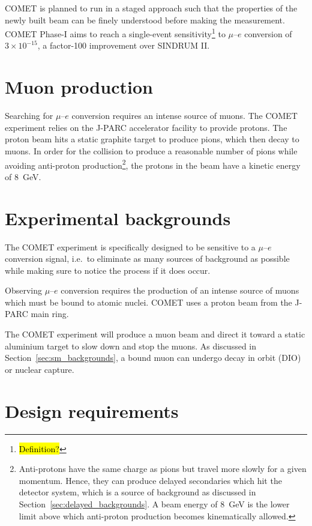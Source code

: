 COMET is planned to run in a staged approach such that the properties of the
newly built beam can be finely understood before making the measurement. COMET
Phase-I aims to reach a single-event sensitivity\footnote{\hl{Definition?}} to $\mu$--$e$ conversion of
$3\times 10^{-15}$, a factor-100 improvement over SINDRUM II.

\section{Muon production}
Searching for $\mu$--$e$ conversion requires an intense source of muons. The
COMET experiment relies on the J-PARC accelerator facility to provide protons.
The proton beam hits a static graphite target to produce pions, which then decay
to muons. In order for the collision to produce a reasonable number of pions
while avoiding anti-proton production\footnote{
Anti-protons have the same charge as pions but travel more slowly for a given
momentum. Hence, they can produce delayed secondaries which hit the detector
system, which is a source of background as discussed in
Section~\ref{sec:delayed_backgrounds}. A beam energy of \SI{8}{\GeV} is the
lower limit above which anti-proton production becomes kinematically allowed.
}, the protons in the beam have a kinetic energy of \SI{8}{\GeV}. 


\section{Experimental backgrounds}\label{sec:backgrounds}
The COMET experiment is specifically designed to be sensitive to a $\mu$--$e$
conversion signal, i.e.\ to eliminate as many sources of background as possible
while making sure to notice the process if it does occur. 

Observing $\mu$--$e$ conversion requires the production of an intense source of
muons which must be bound to atomic nuclei. COMET uses a proton beam from the
J-PARC main ring.


The COMET experiment will produce a
muon beam and direct it toward a static aluminium target to slow down and stop
the muons. As discussed in Section~\ref{sec:sm_backgrounds}, a bound muon can
undergo decay in orbit (DIO) or nuclear capture. 

\section{Design requirements}

